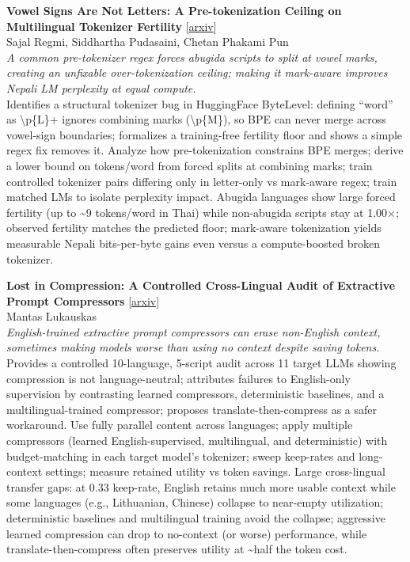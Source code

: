 \documentclass[12pt,letterpaper]{article}
\begin{document}
\medskip

{\small\textbf{Vowel Signs Are Not Letters: A Pre-tokenization Ceiling on Multilingual Tokenizer Fertility}} {\scriptsize[\href{https://arxiv.org/abs/2608.26449}{arxiv}]}\\
{\scriptsize Sajal Regmi, Siddhartha Pudasaini, Chetan Phakami Pun}\\

{\small\textit{A common pre-tokenizer regex forces abugida scripts to split at vowel marks, creating an unfixable over-tokenization ceiling; making it mark-aware improves Nepali LM perplexity at equal compute.}}\\[1pt]
{\footnotesize Identifies a structural tokenizer bug in HuggingFace ByteLevel: defining ``word'' as \textbackslash{}p\{L\}+ ignores combining marks (\textbackslash{}p\{M\}), so BPE can never merge across vowel-sign boundaries; formalizes a training-free fertility floor and shows a simple regex fix removes it. Analyze how pre-tokenization constrains BPE merges; derive a lower bound on tokens/word from forced splits at combining marks; train controlled tokenizer pairs differing only in letter-only vs mark-aware regex; train matched LMs to isolate perplexity impact. Abugida languages show large forced fertility (up to \textasciitilde{}9 tokens/word in Thai) while non-abugida scripts stay at 1.00×; observed fertility matches the predicted floor; mark-aware tokenization yields measurable Nepali bits-per-byte gains even versus a compute-boosted broken tokenizer.}

\medskip

{\small\textbf{Lost in Compression: A Controlled Cross-Lingual Audit of Extractive Prompt Compressors}} {\scriptsize[\href{https://arxiv.org/abs/2608.26175}{arxiv}]}\\
{\scriptsize Mantas Lukauskas}\\

{\small\textit{English-trained extractive prompt compressors can erase non-English context, sometimes making models worse than using no context despite saving tokens.}}\\[1pt]
{\footnotesize Provides a controlled 10-language, 5-script audit across 11 target LLMs showing compression is not language-neutral; attributes failures to English-only supervision by contrasting learned compressors, deterministic baselines, and a multilingual-trained compressor; proposes translate-then-compress as a safer workaround. Use fully parallel content across languages; apply multiple compressors (learned English-supervised, multilingual, and deterministic) with budget-matching in each target model's tokenizer; sweep keep-rates and long-context settings; measure retained utility vs token savings. Large cross-lingual transfer gaps: at 0.33 keep-rate, English retains much more usable context while some languages (e.g., Lithuanian, Chinese) collapse to near-empty utilization; deterministic baselines and multilingual training avoid the collapse; aggressive learned compression can drop to no-context (or worse) performance, while translate-then-compress often preserves utility at \textasciitilde{}half the token cost.}
\end{document}

